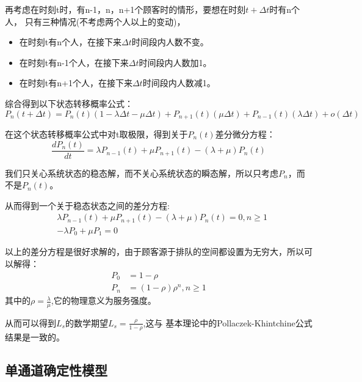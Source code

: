再考虑在时刻t时，有n-1，n，n+1个顾客时的情形，要想在时刻$t+\Delta t$时有n个人，
只有三种情况(不考虑两个人以上的变动)，
\begin{itemize}
\item 在时刻t有n个人，在接下来$\Delta t$时间段内人数不变。
\item 在时刻t有n-1个人，在接下来$\Delta t$时间段内人数加1。
\item 在时刻t有n+1个人，在接下来$\Delta t$时间段内人数减1。 
\end{itemize}


综合得到以下状态转移概率公式：
\begin{equation}
    P_n(t+\Delta t)=P_n(t)(1-\lambda \Delta t-\mu \Delta t)+P_{n+1}(t)(\mu \Delta t) +P_{n-1}(t)(\lambda \Delta t)+o(\Delta t)
\end{equation}

在这个状态转移概率公式中对t取极限，得到关于$P_n(t)$差分微分方程：
\begin{equation}
    \frac{d P_n(t)}{dt}=\lambda P_{n-1}(t)+\mu P_{n+1}(t)-(\lambda+\mu )P_n(t)
\end{equation}

我们只关心系统状态的稳态解，而不关心系统状态的瞬态解，所以只考虑$P_n$，而不是$P_n(t)$。

从而得到一个关于稳态状态之间的差分方程:
\begin{equation}
    \begin{aligned}
        & \lambda P_{n-1}(t)+\mu P_{n+1}(t)-(\lambda+\mu )P_n(t)=0,n\geq 1 \\
        & -\lambda P_{0}+\mu P_{1}=0
    \end{aligned}
\end{equation}

以上的差分方程是很好求解的，由于顾客源于排队的空间都设置为无穷大，所以可以解得：
\begin{equation}
    \begin{aligned}
        P_0 &=1-\rho \\
        P_n &=(1-\rho)\rho^n,n\geq1
    \end{aligned}
\end{equation}
其中的$\rho=\frac{\lambda}{\mu}$,它的物理意义为服务强度。

从而可以得到$L_s$的数学期望$L_s=\frac{\rho}{1-\rho}$,这与
基本理论中的Pollaczek-Khintchine公式结果是一致的。

\subsection{单通道确定性模型}
